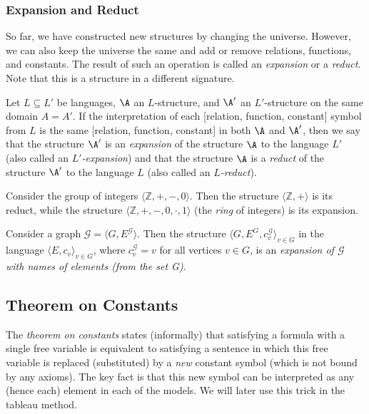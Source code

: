 \subsubsection{Expansion and Reduct}

So far, we have constructed new structures by changing the universe. However, we can also keep the universe the same and add or remove relations, functions, and constants. The result of such an operation is called an \emph{expansion} or a \emph{reduct}. Note that this is a structure in a different signature.

\begin{definition}
    Let $L\subseteq L'$ be languages, $\A$ an $L$-structure, and $\A'$ an $L'$-structure on the same domain $A=A'$. If the interpretation of each [relation, function, constant] symbol from $L$  is the same [relation, function, constant] in both $\A$ and $\A'$, then we say that the structure $\A'$ is an \emph{expansion} of the structure $\A$ to the language $L'$ (also called an \emph{$L'$-expansion}) and that the structure $\A$ is a \emph{reduct} of the structure $\A'$ to the language $L$ (also called an \emph{$L$-reduct}).    
\end{definition}

\begin{example}
    Consider the group of integers $\langle\mathbb Z,+,-,0\rangle$. Then the structure $\langle \mathbb Z,+\rangle$ is its reduct, while the structure $\langle\mathbb Z,+,-,0,\cdot,1\rangle$ (the \emph{ring} of integers) is its expansion.
\end{example}

\begin{example}
    Consider a graph $\mathcal G=\langle G, E^\mathcal G\rangle$. Then the structure $\langle G, E^G,c_v^\mathcal G\rangle_{v\in G}$ in the language $\langle E,c_v\rangle_{v\in G}$, where $c_v^\mathcal G=v$ for all vertices $v\in G$, is an \emph{expansion of $\mathcal G$ with names of elements (from the set G)}.
\end{example}


\subsection{Theorem on Constants}

The \emph{theorem on constants} states (informally) that satisfying a formula with a single free variable is equivalent to satisfying a sentence in which this free variable is replaced (substituted) by a \emph{new} constant symbol (which is not bound by any axioms). The key fact is that this new symbol can be interpreted as any (hence each) element in each of the models. We will later use this trick in the tableau method.

